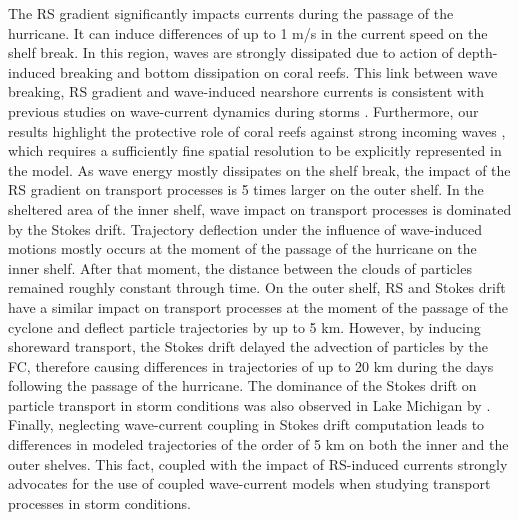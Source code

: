 
The RS gradient significantly impacts currents during the passage of the hurricane. It can induce differences of up to 1 m/s in the current speed on the shelf break. In this region, waves are strongly dissipated due to action of depth-induced breaking and bottom dissipation on coral reefs. This link between wave breaking, RS gradient and wave-induced nearshore currents is consistent with previous studies on wave-current dynamics during storms \citep{mao2017dynamics,mao2018wave,mao2020particle}. Furthermore, our results highlight the protective role of coral reefs against strong incoming waves \citep{lowe2005spectral}, which requires a sufficiently fine spatial resolution to be explicitly represented in the model. As wave energy mostly dissipates on the shelf break, the impact of the RS gradient on transport processes is 5 times larger on the outer shelf. In the sheltered area of the inner shelf, wave impact on transport processes is dominated by the Stokes drift. Trajectory deflection under the influence of wave-induced motions mostly occurs at the moment of the passage of the hurricane on the inner shelf. After that moment, the distance between the clouds of particles remained roughly constant through time. On the outer shelf, RS and Stokes drift have a similar impact on transport processes at the moment of the passage of the cyclone and deflect particle trajectories by up to 5 km. However, by inducing shoreward transport, the Stokes drift delayed the advection of particles by the FC, therefore causing differences in trajectories of up to 20 km during the days following the passage of the hurricane. The dominance of the Stokes drift on particle transport in storm conditions was also observed in Lake Michigan by \cite{mao2020particle}. Finally, neglecting wave-current coupling in Stokes drift computation leads to differences in modeled trajectories of the order of 5 km on both the inner and the outer shelves. This fact, coupled with the impact of RS-induced currents strongly advocates for the use of coupled wave-current models when studying transport processes in storm conditions.

